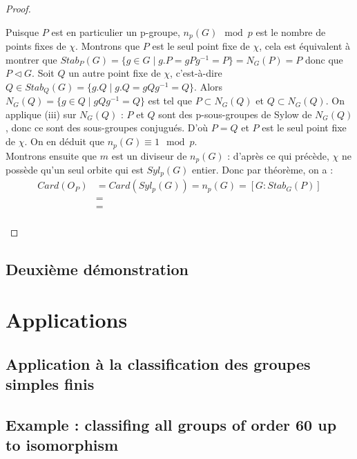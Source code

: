 \documentclass[french]{article}
\theoremstyle{definition}
\theoremstyle{plain}
\theoremstyle{plain}
\theoremstyle{plain}
\theoremstyle{plain}
\theoremstyle{plain}
\begin{document}
\begin{proof}
\begin{enumerate}[label={\upshape(\roman*)}]
Puisque \( P \) est en particulier un p-groupe, \( n_p(G) \mod p \) est le nombre de points fixes de \( \chi \). Montrons que \( P \) est le seul point fixe de \( \chi \), cela est équivalent à montrer que \( Stab_P(G) = \{ g \in G \mid g.P = gPg^{-1} = P \} = N_G(P) = P \) donc que \( P \triangleleft G \). Soit \( Q \) un autre point fixe de \( \chi \), c'est-à-dire \(Q \in Stab_Q(G) = \{g.Q \mid g.Q = gQg^{-1} = Q \}  \). 
Alors \( N_G(Q) = \{ g \in Q \mid gQg^{-1} = Q\} \) est tel que \( P \subset N_G(Q) \) et \( Q \subset N_G(Q) \).
On applique (iii) sur \( N_G(Q) \) : \( P \) et \( Q \) sont des p-sous-groupes de Sylow de \( N_G(Q) \), donc ce sont des sous-groupes conjugués. D'où \( P = Q \) et \( P \) est le seul point fixe de \( \chi \). On en déduit que \( n_p(G) \equiv 1 \mod p \). \\
Montrons ensuite que \( m \) est un diviseur de \( n_p(G) \) : d'après ce qui précède, \( \chi \) ne possède qu'un seul orbite qui est \( Syl_p({G}) \) entier. Donc par théorème, on a :
\begin{align*}
	Card(O_P)&= Card(Syl_p(G)) = n_p(G) = [G : Stab_G(P) ] \\ 
	&= \\
	&= \\
\end{align*}

	\end{enumerate}
\end{proof}


\subsection{Deuxième démonstration}


\clearpage
\section{Applications}
\subsection{Application à la classification des groupes simples finis}

\cite{dummit2003abstract}

\subsection{Example : classifing all groups of order 60 up to isomorphism}


\clearpage

\printbibliography
\end{document}
